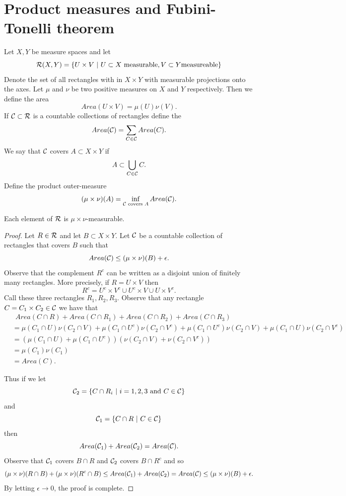\documentclass[twoside, a4paper, 10pt]{amsart}
\begin{document}
\section{Product measures and Fubini-Tonelli theorem}

Let $X,Y$ be measure spaces and let $$\mathcal{R}(X,Y) = \{ U \times V ~|~ U \subset X \text{ measurable}, V \subset Y \text{measureable}\}$$ Denote the set of all rectangles with in $X \times Y$ with measurable projections onto the axes. Let $\mu$ and $\nu$ be two positive measures on $X$ and $Y$ respectively. Then we define the area $$Area(U \times V) = \mu(U)\nu(V).$$ If $\mathcal{C} \subset \mathcal{R}$ is a countable collections of rectangles define the $$Area(\mathcal{C}) = \sum_{C \in \mathcal{C}} Area(C).$$ We say that $\mathcal{C}$ covers $A \subset X \times Y$ if $$A \subset \bigcup_{C \in \mathcal{C}} C.$$ Define the product outer-measure $$( \mu \times \nu) (A) = \inf_{\mathcal{C} \text{ covers } A} Area(\mathcal{C}).$$ 
\begin{prop} Each element of $\mathcal{R}$ is $\mu \times \nu$-measurable.

\end{prop}

\begin{proof} Let $R \in \mathcal{R}$ and let $B \subset X \times Y$. Let $\mathcal{C}$ be a countable collection of rectangles that covers $B$ such that $$Area(\mathcal{C}) \leq (\mu \times \nu) (B) + \epsilon.$$ Observe that the complement $R^c$ can be written as a disjoint union of finitely many rectangles. More precisely, if $R = U \times V$ then $$R^c = U^c \times V^c \cup U^c \times V \cup U \times V^c.$$ Call these three rectangles $R_1,R_2,R_3$. Observe that any rectangle $C = C_1 \times C_2 \in \mathcal{C}$ we have that
\begin{align*}&~~ Area(C \cap R) + Area(C \cap R_1) + Area(C \cap R_2) + Area(C \cap R_3) \\
&= \mu(C_1 \cap U) \nu(C_2 \cap V) + \mu(C_1 \cap U^c)\nu(C_2 \cap V^c) + \mu(C_1 \cap U^c)\nu(C_2 \cap V) + \mu(C_1 \cap U)\nu(C_2 \cap V^c) \\
&= (\mu(C_1 \cap U) + \mu(C_1 \cap U^c))(\nu(C_2 \cap V) + \nu(C_2 \cap V^c)) \\
&= \mu(C_1)\nu(C_1) \\
&= Area(C). \end{align*} 

Thus if we let $$\mathcal{C}_2 = \{ C \cap R_i ~|~ i=1,2,3 \text{ and } C \in \mathcal{C} \}$$ and $$\mathcal{C}_1 = \{ C \cap R ~|~ C \in \mathcal{C}\}$$ then $$Area(\mathcal{C}_1) + Area(\mathcal{C}_2) = Area(\mathcal{C}).$$ Observe that $\mathcal{C}_1$ covers $B \cap R$ and $\mathcal{C}_2$ covers $B \cap R^c$ and so $$(\mu \times \nu)(R \cap B) + (\mu \times \nu)(R^c \cap B) \leq Area(\mathcal{C}_1) + Area(\mathcal{C}_2) = Area(\mathcal{C}) \leq (\mu \times \nu) (B) + \epsilon.$$ By letting $\epsilon \to 0$, the proof is complete. \end{proof}
\end{document}
